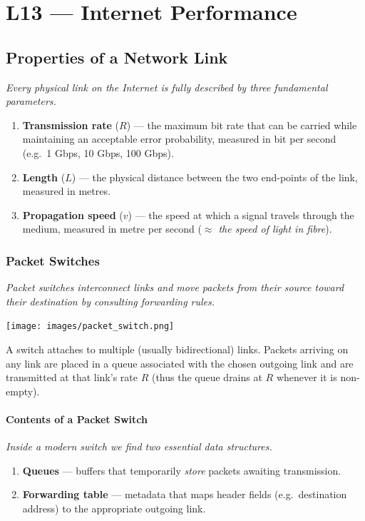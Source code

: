 \documentclass[../../compsys.tex]{subfiles}
\begin{document}
\raggedbottom
\chapter{L13 — Internet Performance}
\vfill
\raggedbottom
\section{Properties of a Network Link}
\textit{Every physical link on the Internet is fully described by three fundamental parameters.}
\begin{enumerate}
  \item \textbf{Transmission rate} (\(R\)) — the maximum bit rate that can be carried while maintaining an acceptable error probability, measured in bit per second (e.g.\ 1 Gbps, 10 Gbps, 100 Gbps).
  \item \textbf{Length} (\(L\)) — the physical distance between the two end-points of the link, measured in metres.
  \item \textbf{Propagation speed} (\(v\)) — the speed at which a signal travels through the medium, measured in metre per second (\emph{$\approx$ the speed of light in fibre}).
\end{enumerate}
\newpage
\subsection{Packet Switches}
\textit{Packet switches interconnect links and move packets from their source toward their destination by consulting forwarding rules.}

\begin{center}
  \texttt{[image: images/packet\_switch.png]}
\end{center}

A switch attaches to multiple (usually bidirectional) links.  
Packets arriving on any link are placed in a queue associated with the chosen outgoing link and are transmitted at that link's rate \(R\) (thus the queue drains at \(R\) whenever it is non-empty).

\subsubsection{Contents of a Packet Switch}
\textit{Inside a modern switch we find two essential data structures.}
\begin{enumerate}
  \item \textbf{Queues} — buffers that temporarily \emph{store} packets awaiting transmission.
  \item \textbf{Forwarding table} — metadata that maps header fields (e.g.\ destination address) to the appropriate outgoing link.
\end{enumerate}
\end{document}
